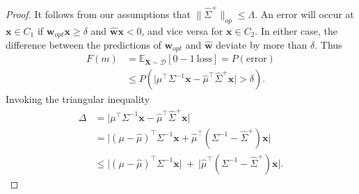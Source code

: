 \documentclass{article}
\newcommand{\E}{\mathbb{E}}
\newcommand{\bx}{\bm{x}}
\newcommand{\bw}{\bm{w}}
\newcommand{\Wo}{\bw_{\scriptscriptstyle opt}}
\newcommand{\bX}{{\mathbf X}}
\newcommand{\Dd}{\mathcal{D}}
\begin{document}
\label{app:proof_thm_4}
\begin{proof}
It follows from our assumptions that $\|\hat\Sigma^{+}\|_{op}\leq\Lambda$. An error will occur at $\bx\in C_1$ if $\Wo\bx\geq\delta$ and $\hat {\bw}\bx< 0$, and vice versa for $\bx\in C_2$. In either case, the difference between the predictions of $\Wo$ and $\hat {\bw}$ deviate by more than $\delta$. Thus
\begin{equation*}
\begin{split}
F(m) &= \E_{\bX\sim\Dd}[\mathrm{0-1~loss}] = P(\mathrm{error})\\
&\leq  P \left(\big|\mu^\top\Sigma^{-1}\bx - \hat\mu^\top \hat\Sigma^{+}\bx\big | > \delta\right).
\end{split}
\end{equation*}
Invoking the triangular inequality
\begin{equation}
\label{eq:1}
\begin{split}
\Delta&=\big |\mu^\top\Sigma^{-1}\bx - \hat\mu^\top \hat\Sigma^{+}\bx\big | \\
&=\big | (\mu-\hat\mu)^\top\Sigma^{-1}\bx + \hat\mu^\top (\Sigma^{-1} - \hat\Sigma^{+})\bx \big |  \\
& \leq\big | (\mu-\hat\mu)^\top\Sigma^{-1}\bx \big | ~+~ \big |\hat\mu^\top (\Sigma^{-1} - \hat\Sigma^{+})\bx \big |.
\end{split}
\end{equation}


\end{proof}
\end{document}
